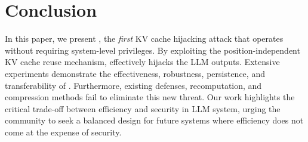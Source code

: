 \section{Conclusion}

In this paper, we present \sys, the \textit{first} KV cache hijacking attack that operates without requiring system-level privileges. By exploiting the position-independent KV cache reuse mechanism, \sys effectively hijacks the LLM outputs. Extensive experiments demonstrate the effectiveness, robustness, persistence, and transferability of \sys. 
% 
Furthermore, existing defenses, recomputation, and compression methods fail to eliminate this new threat.
% 
Our work highlights the critical trade-off between efficiency and security in LLM system, urging the community to seek a balanced design for future systems where efficiency does not come at the expense of security.